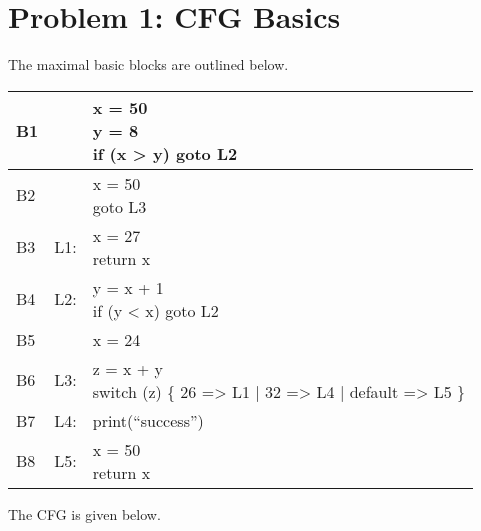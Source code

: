 \section*{Problem 1: CFG Basics}

The maximal basic blocks are outlined below. 


\begin{table}[!ht]
\centering
\begin{tabular}{| l | l l |}
\hline
B1 & & \shortstack[l]{x = 50 \\ y = 8 \\ if (x > y) goto L2} \\
\hline
B2 & & \shortstack[l]{x = 50 \\ goto L3} \\
\hline
B3 & L1: & \shortstack[l]{x = 27 \\ return x}\\
\hline
B4 & L2: & \shortstack[l]{y = x + 1 \\ if (y < x) goto L2}\\
\hline
B5 &  & x = 24\\
\hline
B6 & L3: & \shortstack[l]{z = x + y \\ switch (z) \{ 26 => L1 | 32 => L4 | default => L5 \} } \\
\hline
B7 & L4: & print(``success'') \\
\hline
B8 & L5: & \shortstack[l]{x = 50\\return x}\\
\hline
\end{tabular}
\end{table}

The CFG is given below.

